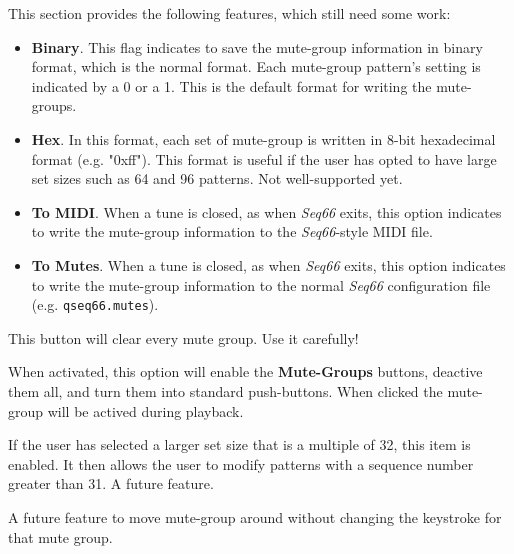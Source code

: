    This section provides the following features, which still need some work:

      \begin{itemize}
         \item \textbf{Binary}.
            This flag indicates to save the mute-group information in
            binary format, which is the normal format.
            Each mute-group pattern's setting is indicated by a 0 or a 1.
            This is the default format for writing the mute-groups.
         \item \textbf{Hex}.
            In this format, each set of mute-group is written in 8-bit hexadecimal
            format (e.g. "0xff").  This format is useful if the user has opted to
            have large set sizes such as 64 and 96 patterns.  Not well-supported
            yet.
         \item \textbf{To MIDI}.
            When a tune is closed, as when \textsl{Seq66} exits, this option
            indicates to write the mute-group information to the
            \textsl{Seq66}-style MIDI file.
         \item \textbf{To Mutes}.
            When a tune is closed, as when \textsl{Seq66} exits, this option
            indicates to write the mute-group information to the normal
            \textsl{Seq66} configuration file (e.g. \texttt{qseq66.mutes}).
      \end{itemize}

      This button will clear every mute group. Use it carefully!

      When activated, this option will enable the \textbf{Mute-Groups} buttons,
      deactive them all, and turn them into standard push-buttons.  When clicked
      the mute-group will be actived during playback.

      If the user has selected a larger set size that is a multiple of 32, this
      item is enabled.  It then allows the user to modify patterns with a
      sequence number greater than 31.  A future feature.

      A future feature to move mute-group around without
      changing the keystroke for that mute group.

